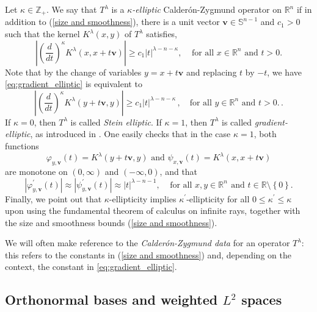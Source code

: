 \documentclass{amsart}%
\theoremstyle{plain}
\numberwithin{equation}{section}
\begin{document}
Let $\kappa\in\mathbb{Z}_{+}$. We say that $T^{\lambda}$ is a $\kappa
$\emph{-elliptic} Calder\'{o}n-Zygmund operator on $\mathbb{R}^{n}$ if in
addition to (\ref{size and smoothness}), there is a unit vector $\mathbf{v}%
\in\mathbb{S}^{n-1}$ and $c_{1}>0$ such that the kernel $K^{\lambda}\left(
x,y\right)  $ of $T^{\lambda}$ satisfies,
\begin{equation}
\label{eq:gradient_elliptic}\left\vert \left(
\frac{d}{dt}\right)  ^{\kappa}K^{\lambda}\left(  x,x+t\mathbf{v}\right)
\right\vert \geq c_{1}\left | t \right |^{\lambda-n-\kappa},\ \ \ \ \ \text{for all }%
x\in\mathbb{R}^{n}\text{ and }t>0\text{.}%
\end{equation}
Note that by the change of variables $y = x+ t \mathbf{v}$ and replacing $t$ by $-t$, we have \eqref{eq:gradient_elliptic} is equivalent to  
\[
\left\vert \left(  \frac{d}{dt}\right)  ^{\kappa
}K^{\lambda}\left(  y+t\mathbf{v},y\right)  \right\vert \geq c_{1}\left | t \right |^{\lambda-n-\kappa} \, , \quad \text{for all }%
y \in\mathbb{R}^{n}\text{ and }t>0\text{.}%
\, . 
\]
If $\kappa=0$, then $T^{\lambda}$ is called \emph{Stein elliptic}. If $\kappa=1$, then $T^{\lambda}$ is called \emph{gradient-elliptic}, as introduced in \cite{SaShUr10}. One easily checks
that in the case $\kappa=1$, both functions
\[
\varphi_{y,\mathbf{v}}\left(  t\right)  =K^{\lambda}\left(  y+t\mathbf{v}%
,y\right)  \text{ and }\psi_{x,\mathbf{v}}\left(  t\right)  =K^{\lambda
}\left(  x,x+t\mathbf{v}\right)
\]
are monotone on $\left(  0,\infty\right)  $ and $\left(  -\infty,0\right)  $,
and that
\[
\left\vert \varphi_{y,\mathbf{v}}^{\prime}\left(  t\right)  \right\vert
\approx\left\vert \psi_{y,\mathbf{v}}^{\prime}\left(  t\right)  \right\vert
\approx\left\vert t\right\vert ^{\lambda-n-1},\ \ \ \ \ \text{for all }%
x,y\in\mathbb{R}^{n}\,\ \text{and }t\in\mathbb{R\setminus}\left\{  0\right\}
.
\]
Finally, we point out that $\kappa$-ellipticity implies $\kappa^{\prime}%
$-ellipticity for all $0\leq\kappa^{\prime}\leq\kappa$ upon using the
fundamental theorem of calculus on infinite rays, together with the size and
smoothness bounds (\ref{size and smoothness}).

We will often make reference to the \emph{Calder\'on-Zygmund data} for an operator $T^{\lambda}$: this refers to the constants in (\ref{size and smoothness}) and, depending on the context, the constant in \eqref{eq:gradient_elliptic}. 

\subsection{Orthonormal bases and weighted $L^{2}$ spaces}
\end{document}
